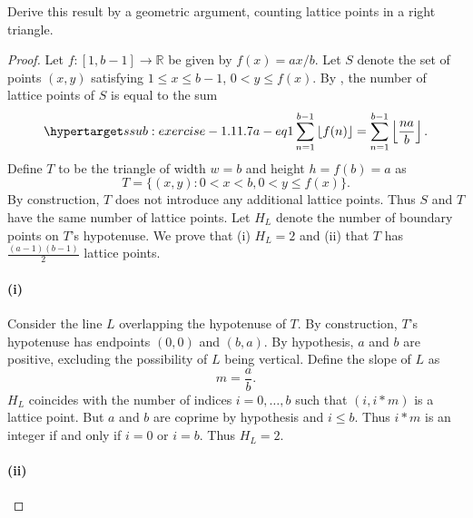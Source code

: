 \documentclass{report}
\begin{document}
\subsubsection{}%

  Derive this result by a geometric argument, counting lattice points in a right
    triangle.

  \begin{proof}

    Let $f \colon [1, b - 1] \rightarrow \mathbb{R}$ be given by
      $f(x) = ax / b$.
    Let $S$ denote the set of points $(x, y)$ satisfying $1 \leq x \leq b - 1$,
      $0 < y \leq f(x)$.
    By , the number of lattice points of $S$ is
      equal to the sum
      \begin{equation}
        \hyperlabel{ssub:exercise-1.11.7a-eq1}
        \sum_{n=1}^{b-1} \floor{f(n)} = \sum_{n=1}^{b-1} \floor{\frac{na}{b}}.
      \end{equation}
    Define $T$ to be the triangle of width $w = b$ and height $h = f(b) = a$
      as $$T = \{ (x, y) : 0 < x < b, 0 < y \leq f(x) \}.$$
    By construction, $T$ does not introduce any additional lattice points.
    Thus $S$ and $T$ have the same number of lattice points.
    Let $H_L$ denote the number of boundary points on $T$'s hypotenuse.
    We prove that (i) $H_L = 2$ and (ii) that $T$ has $\frac{(a - 1)(b - 1)}{2}$
      lattice points.

    \paragraph{(i)}%

      Consider the line $L$ overlapping the hypotenuse of $T$.
      By construction, $T$'s hypotenuse has endpoints $(0, 0)$ and $(b, a)$.
      By hypothesis, $a$ and $b$ are positive, excluding the possibility of $L$
        being vertical.
      Define the slope of $L$ as $$m = \frac{a}{b}.$$
      $H_L$ coincides with the number of indices $i = 0, \ldots, b$ such that
        $(i, i * m)$ is a lattice point.
      But $a$ and $b$ are coprime by hypothesis and $i \leq b$.
      Thus $i * m$ is an integer if and only if $i = 0$ or $i = b$.
      Thus $H_L = 2$.

    \paragraph{(ii)}%


\end{proof}
\end{document}
